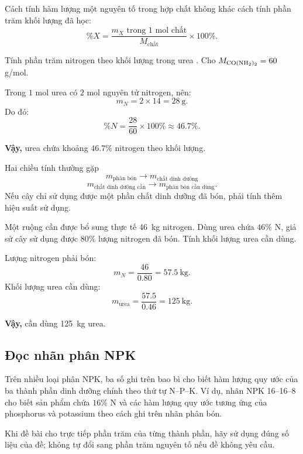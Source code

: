 Cách tính hàm lượng một nguyên tố trong hợp chất không khác cách tính phần trăm khối lượng đã học:
\[
\%X=\frac{m_X\text{ trong }1\text{ mol chất}}{M_{\text{chất}}}\times100\%.
\]

\begin{vidu}
Tính phần trăm nitrogen theo khối lượng trong urea . Cho $M_{\ce{CO(NH2)2}}=60$ g/mol.
\end{vidu}
\begin{loigiai}
Trong $1$ mol urea có $2$ mol nguyên tử nitrogen, nên:
\[
m_N=2\times14=\SI{28}{\gram}.
\]
Do đó:
\[
\%N=\frac{28}{60}\times100\%\approx46.7\%.
\]

\textbf{Vậy,} urea chứa khoảng $46.7\%$ nitrogen theo khối lượng.
\end{loigiai}

\begin{ghinho}{Hai chiều tính thường gặp}
\[
\boxed{m_{\text{phân bón}}}
\longrightarrow
\boxed{m_{\text{chất dinh dưỡng}}}
\]
\[
\boxed{m_{\text{chất dinh dưỡng cần}}}
\longrightarrow
\boxed{m_{\text{phân bón cần dùng}}}.
\]
Nếu cây chỉ sử dụng được một phần chất dinh dưỡng đã bón, phải tính thêm hiệu suất sử dụng.
\end{ghinho}

\begin{vidu}
Một ruộng cần được bổ sung thực tế \SI{46}{\kilo\gram} nitrogen. Dùng urea chứa $46\%$ N, giả sử cây sử dụng được $80\%$ lượng nitrogen đã bón. Tính khối lượng urea cần dùng.
\end{vidu}
\begin{loigiai}
Lượng nitrogen phải bón:
\[
m_N=\frac{46}{0.80}=\SI{57.5}{\kilo\gram}.
\]
Khối lượng urea cần dùng:
\[
m_{\text{urea}}=\frac{57.5}{0.46}=\SI{125}{\kilo\gram}.
\]

\textbf{Vậy,} cần dùng \SI{125}{\kilo\gram} urea.
\end{loigiai}

\subsection{Đọc nhãn phân NPK}

Trên nhiều loại phân NPK, ba số ghi trên bao bì cho biết hàm lượng quy ước của ba thành phần dinh dưỡng chính theo thứ tự N--P--K. Ví dụ, nhãn NPK 16--16--8 cho biết sản phẩm chứa $16\%$ N và các hàm lượng quy ước tương ứng của phosphorus và potassium theo cách ghi trên nhãn phân bón.

Khi đề bài cho trực tiếp phần trăm của từng thành phần, hãy sử dụng đúng số liệu của đề; không tự đổi sang phần trăm nguyên tố nếu đề không yêu cầu.


